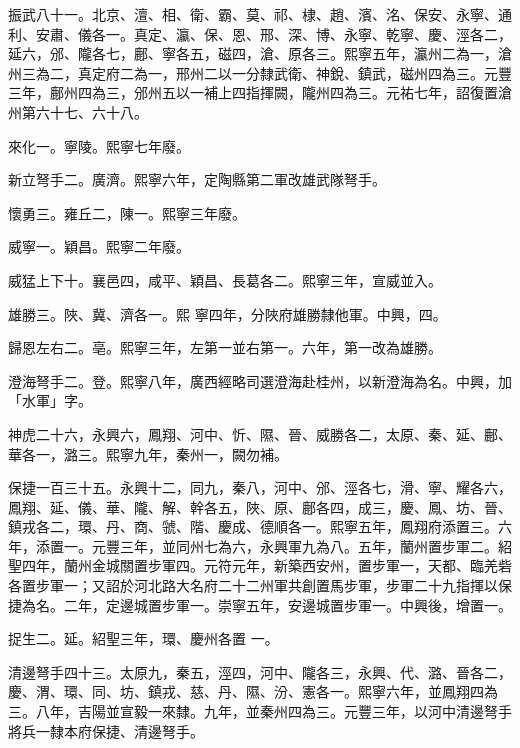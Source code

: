 \begin{pinyinscope}
 振武八十一。北京、澶、相、衛、霸、莫、祁、棣、趙、濱、洺、保安、永寧、通利、安肅、儀各一。真定、瀛、保、恩、邢、深、博、永寧、乾寧、慶、涇各二，延六，邠、隴各七，鄜、寧各五，磁四，滄、原各三。熙寧五年，瀛州二為一，滄州三為二，真定府二為一，邢州二以一分隸武衛、神銳、鎮武，磁州四為三。元豐三年，鄜州四為三，邠州五以一補上四指揮闕，隴州四為三。元祐七年，詔復置滄州第六十七、六十八。



 來化一。寧陵。熙寧七年廢。



 新立弩手二。廣濟。熙寧六年，定陶縣第二軍改雄武隊弩手。



 懷勇三。雍丘二，陳一。熙寧三年廢。



 威寧一。穎昌。熙寧二年廢。



 威猛上下十。襄邑四，咸平、穎昌、長葛各二。熙寧三年，宣威並入。



 雄勝三。陜、冀、濟各一。熙
 寧四年，分陜府雄勝隸他軍。中興，四。



 歸恩左右二。亳。熙寧三年，左第一並右第一。六年，第一改為雄勝。



 澄海弩手二。登。熙寧八年，廣西經略司選澄海赴桂州，以新澄海為名。中興，加「水軍」字。



 神虎二十六，永興六，鳳翔、河中、忻、隰、晉、威勝各二，太原、秦、延、鄜、華各一，潞三。熙寧九年，秦州一，闕勿補。



 保捷一百三十五。永興十二，同九，秦八，河中、邠、涇各七，滑、寧、耀各六，鳳翔、延、儀、華、隴、解、幹各五，陜、原、鄜各四，成三，慶、鳳、坊、晉、鎮戎各二，環、丹、商、虢、階、慶成、德順各一。熙寧五年，鳳翔府添置三。六年，添置一。元豐三年，並同州七為六，永興軍九為八。五年，蘭州置步軍二。紹聖四年，蘭州金城關置步軍四。元符元年，新築西安州，置步軍一，天都、臨羌砦各置步軍一；又詔於河北路大名府二十二州軍共創置馬步軍，步軍二十九指揮以保捷為名。二年，定邊城置步軍一。崇寧五年，安邊城置步軍一。中興後，增置一。



 捉生二。延。紹聖三年，環、慶州各置
 一。



 清邊弩手四十三。太原九，秦五，涇四，河中、隴各三，永興、代、潞、晉各二，慶、渭、環、同、坊、鎮戎、慈、丹、隰、汾、憲各一。熙寧六年，並鳳翔四為三。八年，吉陽並宣毅一來隸。九年，並秦州四為三。元豐三年，以河中清邊弩手將兵一隸本府保捷、清邊弩手。




\end{pinyinscope}
